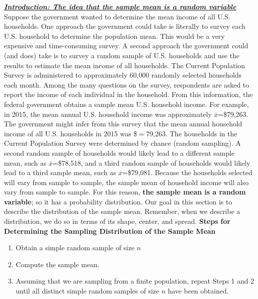 \documentclass{report}
\begin{document}
    \pagebreak \bigbreak \noindent 
    \textbf{\textit{\underline{Introduction: The idea that the sample mean is a \textbf{random variable}}}}
    \bigbreak \noindent 
    Suppose the government wanted to determine the mean income of all U.S. households. One approach the government could take is literally to survey each U.S. household to determine the population mean. This would be a very expensive and time-consuming survey.
    \bigbreak \noindent 
    A second approach the government could (and does) take is to survey a random sample of U.S. households and use the results to estimate the mean income of all households. The Current Population Survey is administered to approximately 60,000 randomly selected households each month. Among the many questions on the survey, respondents are asked to report the income of each individual in the household. From this information, the federal government obtains a sample mean U.S. household income. For example, in 2015, the mean annual U.S. household income was approximately $\overline{x}$=\$79,263. The government might infer from this survey that the mean annual household income of all U.S. households in 2015 was \$\mu $=$79,263.
    \bigbreak \noindent 
    The households in the Current Population Survey were determined by chance (random sampling). A second random sample of households would likely lead to a different sample mean, such as $\overline{x} $=\$78,518, and a third random sample of households would likely lead to a third sample mean, such as $\overline{x} $=\$79,081. Because the households selected will vary from sample to sample, the sample mean of household income will also vary from sample to sample. For this reason, \textbf{the sample mean is a random variable}; so it has a probability distribution. Our goal in this section is to describe the distribution of the sample mean. Remember, when we describe a distribution, we do so in terms of its shape, center, and spread.
    \bigbreak \noindent 
    \textbf{Steps for Determining the Sampling Distribution of the Sample Mean}
    \bigbreak \noindent 
    \begin{enumerate}
        \item Obtain a simple random sample of size $n $
        \item Compute the sample mean.
        \item Assuming that we are sampling from a finite population, repeat Steps 1 and 2 until all distinct simple random samples of size $n $ have been obtained.
    \end{enumerate}
    \bigbreak \noindent 
        
\end{document}
